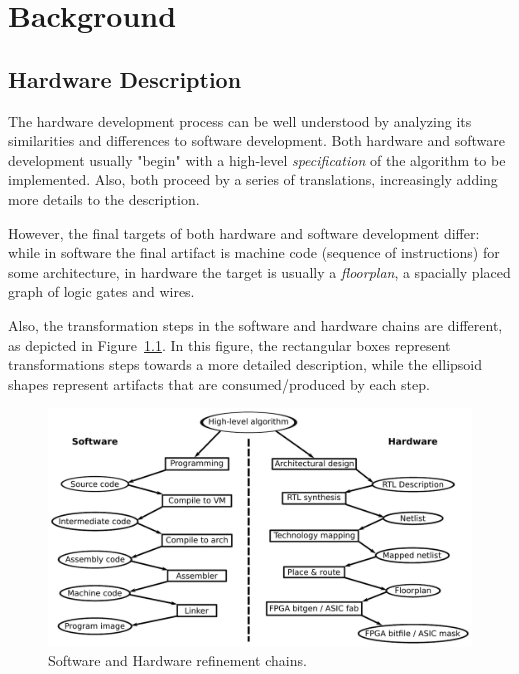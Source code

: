 \chapter{Background}
\label{chap:background}

    \section{Hardware Description}
    \label{sec:hardware-description}
        The hardware development process can be well understood by analyzing its
        similarities and differences to software development.
        Both hardware and software development usually "begin" with a high-level \emph{specification}
        of the algorithm to be implemented.
        Also, both proceed by a series of translations, increasingly adding more details to the description.

        However, the final targets of both hardware and software development differ:
        while in software the final artifact is machine code (sequence of instructions) for some architecture,
        in hardware the target is usually a \emph{floorplan}, a spacially placed graph of logic gates and wires.

        Also, the transformation steps in the software and hardware chains are different,
        as depicted in Figure~\ref{fig:sw-hw-chains}.
        In this figure, the rectangular boxes represent transformations steps towards a more detailed description,
        while the ellipsoid shapes represent artifacts that are consumed/produced by each step.

        \begin{figure}[h]
            \centerline{\includegraphics[width=1.0\textwidth]{imgs/sw-hw-chains.pdf}}
            \caption{Software and Hardware refinement chains. \label{fig:sw-hw-chains}}
        \end{figure}

